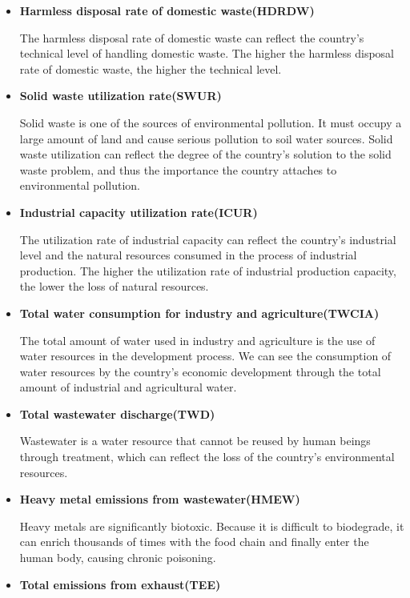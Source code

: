 \documentclass[12pt]{article}
\begin{document}
\begin{itemize}
		\item \textbf{Harmless disposal rate of domestic waste(HDRDW) }
		
		The harmless disposal rate of domestic waste can reflect the country's technical level of handling domestic waste.
		The higher the harmless disposal rate of domestic waste, the higher the technical level.
		
		\item \textbf{Solid waste utilization rate(SWUR)}
		
		Solid waste is one of the sources of environmental pollution.
		It must occupy a large amount of land and cause serious pollution to soil water sources.
		Solid waste utilization can reflect the degree of the country's solution to the solid waste problem, and thus the importance the country attaches to environmental pollution.
		
		\item \textbf{Industrial capacity utilization rate(ICUR) }
		
		The utilization rate of industrial capacity can reflect the country's industrial level and the natural resources consumed in the process of industrial production.
		The higher the utilization rate of industrial production capacity, the lower the loss of natural resources.
		
		\item \textbf{Total water consumption for industry and agriculture(TWCIA) }
		
		The total amount of water used in industry and agriculture is the use of water resources in the development process.
		We can see the consumption of water resources by the country's economic development through the total amount of industrial and agricultural water.
		
		\item \textbf{Total wastewater discharge(TWD)}
		
		Wastewater is a water resource that cannot be reused by human beings through treatment, which can reflect the loss of the country's environmental resources.
		
		\item \textbf{Heavy metal emissions from wastewater(HMEW) }
		
		Heavy metals are significantly biotoxic.
		Because it is difficult to biodegrade, it can enrich thousands of times with the food chain and finally enter the human body, causing chronic poisoning.
		
		\item \textbf{Total emissions from exhaust(TEE)}
		

\end{itemize}
\end{document}
